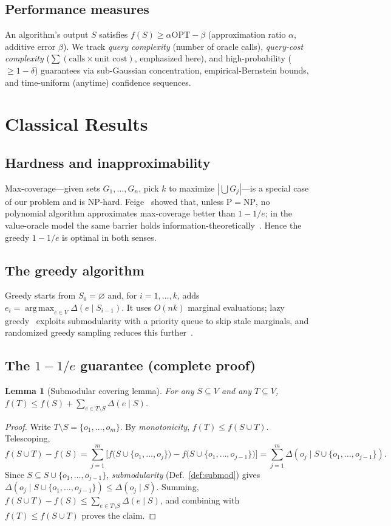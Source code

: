 \documentclass[11pt]{article}
\theoremstyle{plain}
\newtheorem{lemma}{Lemma}
\theoremstyle{definition}
\newcommand{\OPT}{\mathrm{OPT}}
\newcommand{\marg}[2]{\Delta(#1\mid #2)}
\DeclareMathOperator*{\argmax}{arg\,max}
\begin{document}
\subsection{Performance measures}
An algorithm's output $S$ satisfies $f(S)\ge\alpha\OPT-\beta$ (approximation
ratio $\alpha$, additive error $\beta$). We track \emph{query complexity}
(number of oracle calls), \emph{query-cost complexity}
($\sum(\text{calls}\times\text{unit cost})$, emphasized here), and
high-probability ($\ge 1-\delta$) guarantees via sub-Gaussian concentration,
empirical-Bernstein bounds, and time-uniform (anytime) confidence
sequences.

\section{Classical Results}\label{sec:classical}

\subsection{Hardness and inapproximability}
Max-coverage---given sets $G_1,\dots,G_n$, pick $k$ to maximize
$|\bigcup G_j|$---is a special case of our problem and is NP-hard.
Feige~\cite{Feige1998} showed that, unless $\mathrm{P}=\mathrm{NP}$, no
polynomial algorithm approximates max-coverage better than $1-1/e$; in the
value-oracle model the same barrier holds
information-theoretically~\cite{NW1978oracle}. Hence the greedy $1-1/e$ is
optimal in both senses.

\subsection{The greedy algorithm}
Greedy starts from $S_0=\varnothing$ and, for $i=1,\dots,k$, adds
$e_i=\argmax_{e\in V}\marg{e}{S_{i-1}}$. It uses $O(nk)$ marginal
evaluations; lazy greedy~\cite{Minoux1978} exploits submodularity with a
priority queue to skip stale marginals, and randomized greedy sampling
reduces this further~\cite{Mirzasoleiman2015}.

\subsection{The \texorpdfstring{$1-1/e$}{1-1/e} guarantee (complete proof)}
\begin{lemma}[Submodular covering lemma]\label{lem:cover}
For any $S\subseteq V$ and any $T\subseteq V$,
$f(T)\le f(S)+\sum_{e\in T\setminus S}\marg{e}{S}$.
\end{lemma}
\begin{proof}
Write $T\setminus S=\{o_1,\dots,o_m\}$. By \emph{monotonicity},
$f(T)\le f(S\cup T)$. Telescoping,
\[
f(S\cup T)-f(S)=\sum_{j=1}^{m}\Big[f\big(S\cup\{o_1,\dots,o_j\}\big)
   -f\big(S\cup\{o_1,\dots,o_{j-1}\}\big)\Big]
   =\sum_{j=1}^{m}\marg{o_j}{S\cup\{o_1,\dots,o_{j-1}\}}.
\]
Since $S\subseteq S\cup\{o_1,\dots,o_{j-1}\}$, \emph{submodularity}
(Def.~\ref{def:submod}) gives
$\marg{o_j}{S\cup\{o_1,\dots,o_{j-1}\}}\le\marg{o_j}{S}$. Summing,
$f(S\cup T)-f(S)\le\sum_{e\in T\setminus S}\marg{e}{S}$, and combining with
$f(T)\le f(S\cup T)$ proves the claim.
\end{proof}
\end{document}
